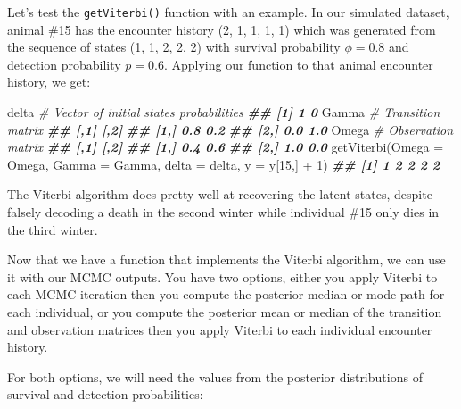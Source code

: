 \documentclass[
  12pt,
]{krantz}
\newenvironment{Shaded}{\begin{snugshade}}{\end{snugshade}}
\newcommand{\AttributeTok}[1]{\textcolor[rgb]{0.77,0.63,0.00}{#1}}
\newcommand{\CommentTok}[1]{\textcolor[rgb]{0.56,0.35,0.01}{\textit{#1}}}
\newcommand{\DecValTok}[1]{\textcolor[rgb]{0.00,0.00,0.81}{#1}}
\newcommand{\DocumentationTok}[1]{\textcolor[rgb]{0.56,0.35,0.01}{\textbf{\textit{#1}}}}
\newcommand{\FunctionTok}[1]{\textcolor[rgb]{0.00,0.00,0.00}{#1}}
\newcommand{\NormalTok}[1]{#1}
\newcommand{\OtherTok}[1]{\textcolor[rgb]{0.56,0.35,0.01}{#1}}
\newcommand{\SpecialCharTok}[1]{\textcolor[rgb]{0.00,0.00,0.00}{#1}}
\newcommand{\StringTok}[1]{\textcolor[rgb]{0.31,0.60,0.02}{#1}}
\begin{document}
Let's test the \texttt{getViterbi()} function with an example. In our simulated dataset, animal \#15 has the encounter history (2, 1, 1, 1, 1) which was generated from the sequence of states (1, 1, 2, 2, 2) with survival probability \(\phi = 0.8\) and detection probability \(p = 0.6\). Applying our function to that animal encounter history, we get:

\begin{Shaded}
\begin{Highlighting}[]
\NormalTok{delta }\CommentTok{\# Vector of initial states probabilities}
\DocumentationTok{\#\# [1] 1 0}
\NormalTok{Gamma }\CommentTok{\# Transition matrix}
\DocumentationTok{\#\#      [,1] [,2]}
\DocumentationTok{\#\# [1,]  0.8  0.2}
\DocumentationTok{\#\# [2,]  0.0  1.0}
\NormalTok{Omega }\CommentTok{\# Observation matrix}
\DocumentationTok{\#\#      [,1] [,2]}
\DocumentationTok{\#\# [1,]  0.4  0.6}
\DocumentationTok{\#\# [2,]  1.0  0.0}
\FunctionTok{getViterbi}\NormalTok{(}\AttributeTok{Omega =}\NormalTok{ Omega, }
           \AttributeTok{Gamma =}\NormalTok{ Gamma, }
           \AttributeTok{delta =}\NormalTok{ delta, }
           \AttributeTok{y =}\NormalTok{ y[}\DecValTok{15}\NormalTok{,] }\SpecialCharTok{+} \DecValTok{1}\NormalTok{)}
\DocumentationTok{\#\# [1] 1 2 2 2 2}
\end{Highlighting}
\end{Shaded}

The Viterbi algorithm does pretty well at recovering the latent states, despite falsely decoding a death in the second winter while individual \#15 only dies in the third winter.

Now that we have a function that implements the Viterbi algorithm, we can use it with our MCMC outputs. You have two options, either you apply Viterbi to each MCMC iteration then you compute the posterior median or mode path for each individual, or you compute the posterior mean or median of the transition and observation matrices then you apply Viterbi to each individual encounter history.

For both options, we will need the values from the posterior distributions of survival and detection probabilities:

\begin{Shaded}
\end{Shaded}
\end{document}
